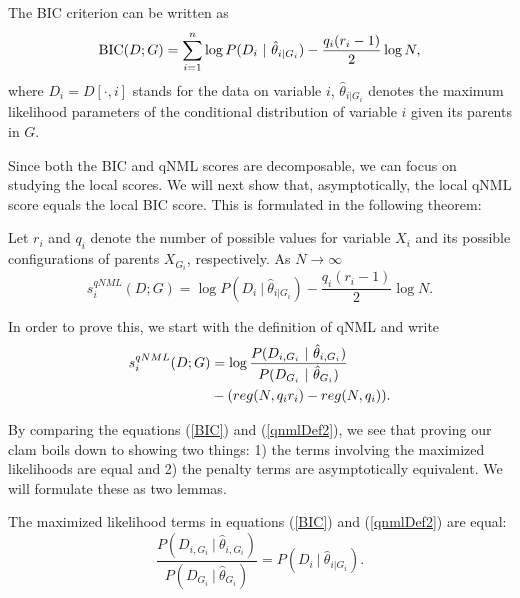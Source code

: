 The BIC criterion can be written as
\begin{equation}\label{BIC}
\textnormal{BIC}(D;G) = \sum_{i = 1}^n \log P(D_i \ | \ \hat{\theta}_{i | G_i} ) - \frac{q_i(r_i - 1)}{2} \log N,
\end{equation}
where $D_i = D[\cdot, i]$ stands for the data on variable $i$,
$\hat{\theta}_{i | G_i}$ denotes the maximum likelihood parameters of
the conditional distribution of variable $i$ given its parents in
$G$. 

Since both the BIC and qNML scores are decomposable, we can focus on
studying the local scores. We will next show that, asymptotically, the
local qNML score equals the local BIC score. This is formulated in the
following theorem:

\begin{theorem}\label{consistency}
Let $r_i$ and $q_i$ denote the number of possible values for variable
$X_i$ and its possible configurations of parents $X_{G_i}$,
respectively. As $N \to \infty$
$$
s^{qNML}_i(D;G) =  \log P(D_i \ | \ \hat{\theta}_{i | G_i} )  - \frac{q_i(r_i - 1)}{2} \log N.
$$
\end{theorem}

In order to prove this, we start with the definition of qNML and write
\begin{align}\label{qnmlDef2}
s^{qNML}_i(D;G) &= \log \frac{P(D_{i, G_i} \ | \ \hat{\theta}_{i, G_i}
  )}{P(D_{G_i} \ | \ \hat{\theta}_{G_i} )} \notag \\ & -(reg(N,q_i
r_i) - reg(N,q_i)).
\end{align}

By comparing the equations (\ref{BIC}) and (\ref{qnmlDef2}), we see
that proving our clam boils down to showing two things: 1) the terms
involving the maximized likelihoods are equal and 2) the penalty terms
are asymptotically equivalent. We will formulate these as two
lemmas.

\begin{lemma}\label{MLLemma} The maximized likelihood terms in equations (\ref{BIC}) and (\ref{qnmlDef2}) are equal:    
$$
\frac{P(D_{i, G_i} \ | \ \hat{\theta}_{i, G_i} )}{P(D_{G_i} \ | \ \hat{\theta}_{G_i} )} = P(D_i \ | \ \hat{\theta}_{i | G_i} ).
$$
\end{lemma}

